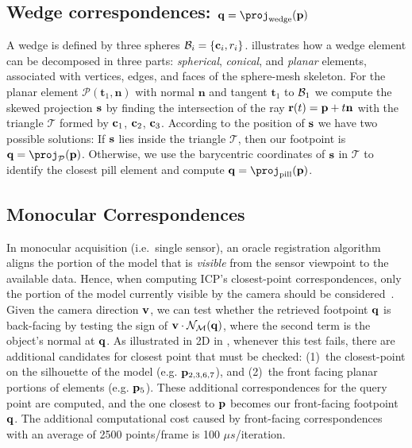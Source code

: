\subsection*{Wedge correspondences: $\footpoint=\proj_\text{wedge}(\pointHmodel)$}
A wedge is defined by three spheres $\mathcal{B}_i = \{\mathbf{c}_i, r_i\}$.   illustrates how a wedge element can be decomposed in three parts: \emph{spherical}, \emph{conical}, and \emph{planar} elements, associated with vertices, edges, and faces of the sphere-mesh skeleton. For the planar element $\mathcal{P}(\mathbf{t}_1,\mathbf{n})$ with normal $\mathbf{n}$ and tangent $\mathbf{t}_1$ to $\mathcal{B}_1$
%
we compute the skewed projection $\mathbf{s}$ by finding the intersection of the ray $\mathbf{r}(t) = \mathbf{p} + t\mathbf{n}$ with the triangle $\mathcal{T}$ formed by $\mathbf{c}_1$, $\mathbf{c}_2$, $\mathbf{c}_3$. 
% 
According to the position of $\mathbf{s}$ we have two possible solutions:
If $\mathbf{s}$ lies inside the triangle $\mathcal{T}$, then our footpoint is $\footpoint = \proj_\mathcal{P}(\pointHmodel)$. Otherwise, we use the barycentric coordinates of $\mathbf{s}$ in $\mathcal{T}$ to identify the closest pill element and compute $\footpoint=\proj_\text{pill}(\pointHmodel)$.

\subsection*{Monocular Correspondences}
In monocular acquisition (i.e.\ single sensor), an oracle registration algorithm aligns the portion of the model that is \emph{visible} from the sensor viewpoint to the available data. Hence, when computing ICP's closest-point correspondences, only the portion of the model currently visible by the camera should be considered~\cite{tagliasacchi2015robust}. Given the camera direction $\mathbf{v}$, we can test whether the retrieved footpoint $\mathbf{q}$ is back-facing by testing the sign of $\mathbf{v} \cdot \mathcal{N}_{\mathcal{M}}(\mathbf{q})$, where the second term is the object's normal at $\mathbf{q}$. As illustrated in 2D in , whenever this test fails, there are additional candidates for closest point that must be checked: (1)~the closest-point on the silhouette of the model (e.g. $\mathbf{p}_{2,3,6,7}$), and (2)~the front facing planar portions of elements (e.g. $\mathbf{p}_{5}$). These additional correspondences for the query point are computed, and the one closest to $\mathbf{p}$ becomes our front-facing footpoint $\mathbf{q}$. The additional computational cost caused by front-facing correspondences with an average of 2500 points/frame is 100 $\mu s$/iteration.

